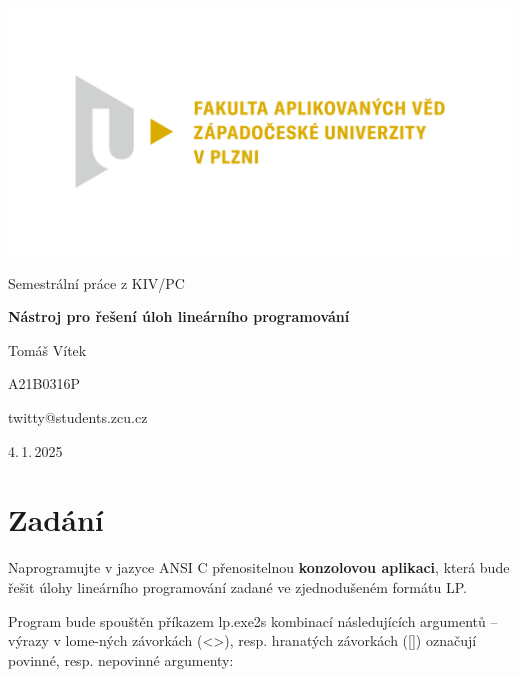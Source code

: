 \documentclass[
12pt,
a4paper,
pdftex,
czech,
titlepage
]{report}
\begin{document}
\begin{titlepage}
	\vspace*{-2cm}
	{\centering\includegraphics[scale=1.0]{logo.png}\par}
	\centering
	\vspace*{2cm}
	{\Large Semestrální práce z KIV/PC\par}
	\vspace{1.5cm}
	{\Huge\bfseries Nástroj pro řešení úloh lineárního programování\par}
	\vspace{2cm}

	{\Large Tomáš Vítek\par}
	{\Large A21B0316P\par}
	{\Large twitty@students.zcu.cz\par}

	\vfill

	{\Large 4.\,1.\,2025}
\end{titlepage}

\tableofcontents
\thispagestyle{empty}
\clearpage

\chapter{Zadání}
\setcounter{page}{1}

Naprogramujte v jazyce ANSI C přenositelnou \textbf{konzolovou aplikaci}, která
bude řešit úlohy lineárního programování zadané ve zjednodušeném formátu
LP.

Program bude spouštěn příkazem lp.exe2s kombinací následujících
argumentů -- výrazy v lome-ných závorkách (\textless\textgreater), resp.
hranatých závorkách ({[}{]}) označují povinné, resp. nepovinné argumenty:
\end{document}
